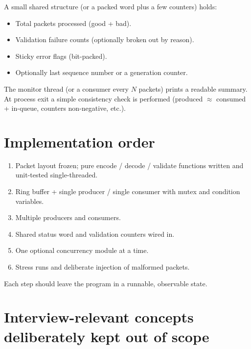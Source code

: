 \documentclass[11pt,a4paper]{article}
\begin{document}
A small shared structure (or a packed word plus a few counters) holds:
\begin{itemize}[leftmargin=*]
    \item Total packets processed (good + bad).
    \item Validation failure counts (optionally broken out by reason).
    \item Sticky error flags (bit-packed).
    \item Optionally last sequence number or a generation counter.
\end{itemize}

The monitor thread (or a consumer every $N$ packets) prints a readable summary.  
At process exit a simple consistency check is performed (produced $\approx$ consumed + in-queue, counters non-negative, etc.).

\section{Implementation order}
\label{sec:impl-order}

\begin{enumerate}[leftmargin=*]
    \item Packet layout frozen; pure encode / decode / validate functions written and unit-tested single-threaded.
    \item Ring buffer + single producer / single consumer with mutex and condition variables.
    \item Multiple producers and consumers.
    \item Shared status word and validation counters wired in.
    \item One optional concurrency module at a time.
    \item Stress runs and deliberate injection of malformed packets.
\end{enumerate}

Each step should leave the program in a runnable, observable state.

\section{Interview-relevant concepts deliberately kept out of scope}
\label{sec:out-of-scope}
\end{document}
